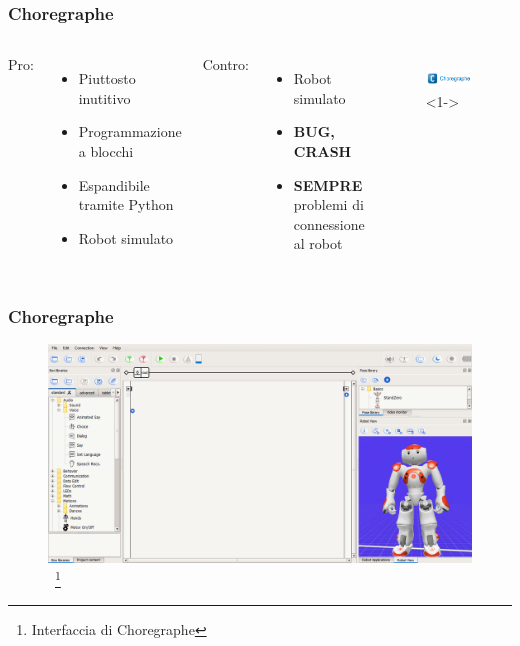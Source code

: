 \documentclass[aspectratio=169]{beamer}
\begin{document}
\begin{frame}
\frametitle{Choregraphe}
\begin{columns}
		Pro:
		\begin{itemize}
			\item<2-> Piuttosto inutitivo
			\item<3-> Programmazione a blocchi
			\item<4-> Espandibile tramite Python
			\item<5-> Robot simulato
		\end{itemize}
		Contro:
		\begin{itemize}
			\item<6-> Robot simulato
			\item<7-> \textbf{BUG, CRASH}
			\item<8-> \textbf{SEMPRE} problemi di connessione al robot
		\end{itemize}
		\begin{figure}[ht]
		\begin{center}
		\includegraphics[width=.7\textwidth]{choregraphe_logo}<1->
		\end{center}
		\end{figure}
\end{columns}
\end{frame}

\begin{frame}
\frametitle{Choregraphe}
\begin{figure}[ht]
\begin{center}
\includegraphics[width=.8\textwidth]{choregraphe.png}
~\footnote{Interfaccia di Choregraphe}
\end{center}
\end{figure}
\end{frame}
\end{document}
